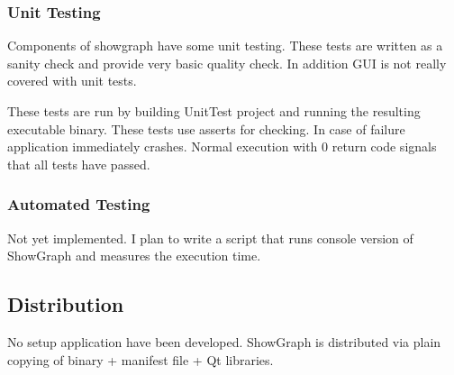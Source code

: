 \documentclass[11pt,twoside,a4paper]{article}
\begin{document}
\subsubsection{Unit Testing}
Components of showgraph have some unit testing. These tests are written as a sanity check and provide very basic quality check. In addition GUI is not really covered with unit tests.

These tests are run by building UnitTest project and running the resulting executable binary. These tests use asserts for checking. In case of failure application immediately crashes. Normal execution with 0 return code signals that all tests have passed.

\subsubsection{Automated Testing}
Not yet implemented. I plan to write a script that runs console version of ShowGraph and measures the execution time.

\subsection{Distribution}
No setup application have been developed. ShowGraph is distributed via plain copying of binary + manifest file + Qt libraries.
\end{document}
